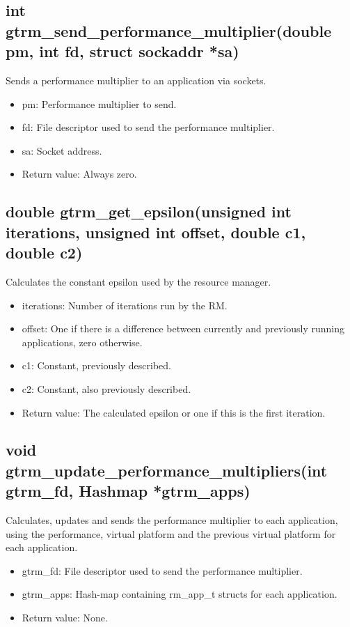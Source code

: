 \documentclass[nobiblatex]{LTHthesis}
\begin{document}
\subsection{int gtrm\_send\_performance\_multiplier(double pm, int fd, struct sockaddr *sa)}
Sends a performance multiplier to an application via sockets.
\begin{itemize} 
\item pm: Performance multiplier to send.
\item fd: File descriptor used to send the performance multiplier.
\item sa: Socket address.
\item Return value: Always zero.
\end{itemize}

\subsection{double gtrm\_get\_epsilon(unsigned int iterations, unsigned int offset, double c1, double c2)}
Calculates the constant epsilon used by the resource manager.
\begin{itemize} 
\item iterations: Number of iterations run by the RM.
\item offset: One if there is a difference between currently and previously running applications, zero otherwise.
\item c1: Constant, previously described.
\item c2: Constant, also previously described.
\item Return value: The calculated epsilon or one if this is the first iteration.
\end{itemize}

\subsection{void gtrm\_update\_performance\_multipliers(int gtrm\_fd, Hashmap *gtrm\_apps)}
Calculates, updates and sends the performance multiplier to each application, using the performance, virtual platform and the previous virtual platform for each application.
\begin{itemize} 
\item gtrm\_fd: File descriptor used to send the performance multiplier.
\item gtrm\_apps: Hash-map containing rm\_app\_t structs for each application.
\item Return value: None.
\end{itemize}
\end{document}
